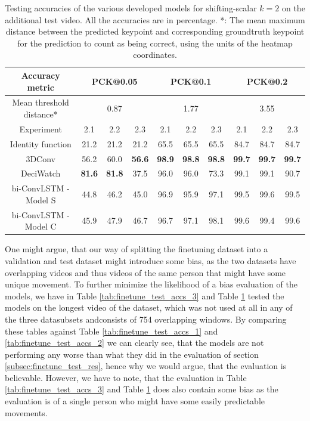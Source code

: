 \documentclass[./main.tex]{subfiles}
\begin{document}
\begin{table}[htbp]
    \begin{tabular}{c||ccc|ccc|ccc}
        \hline
        Accuracy metric & \multicolumn{3}{c}{PCK@0.05} & \multicolumn{3}{c}{PCK@0.1} & \multicolumn{3}{c}{PCK@0.2} \\
        \hline
        Mean threshold distance* & \multicolumn{3}{c}{0.87} & \multicolumn{3}{c}{1.77} & \multicolumn{3}{c}{3.55} \\
        \hline
        Experiment & 2.1 & 2.2 & 2.3 & 2.1 & 2.2 & 2.3 & 2.1 & 2.2 & 2.3 \\
        \hline
        \hline
        Identity function & 21.2 & 21.2 & 21.2 & 65.5 & 65.5 & 65.5 & 84.7 & 84.7 & 84.7 \\
        3DConv & 56.2 & 60.0 & \textbf{56.6} & \textbf{98.9} & \textbf{98.8} & \textbf{98.8} & \textbf{99.7} & \textbf{99.7} & \textbf{99.7} \\
        DeciWatch & \textbf{81.6} & \textbf{81.8} & 37.5 & 96.0 & 96.0 & 73.3 & 99.1 & 99.1 & 90.7 \\
        bi-ConvLSTM - Model S & 44.8 & 46.2 & 45.0 & 96.9 & 95.9 & 97.1 & 99.5 & 99.6 & 99.5 \\
        bi-ConvLSTM - Model C & 45.9 & 47.9 & 46.7 & 96.7 & 97.1 & 98.1 & 99.6 & 99.4 & 99.6 \\
        \hline
    \end{tabular}
    \caption{Testing accuracies of the various developed models for shifting-scalar $k = 2$ on the additional test video. All the accuracies are in percentage. *: The mean maximum distance between the predicted keypoint and corresponding groundtruth keypoint for the prediction to count as being correct, using the units of the heatmap coordinates.}
    \label{tab:finetune_test_accs_4}
\end{table}

\noindent One might argue, that our way of splitting the finetuning dataset into a validation and test dataset might introduce some bias, as the two datasets have overlapping videos and thus videos of the same person that might have some unique movement. To further minimize the likelihood of a bias evaluation of the models, we have in Table \ref{tab:finetune_test_accs_3} and Table \ref{tab:finetune_test_accs_4} tested the models on the longest video of the dataset, which was not used at all in any of the three datasubsets andconsists of 754 overlapping windows. By comparing these tables against Table \ref{tab:finetune_test_accs_1} and \ref{tab:finetune_test_accs_2} we can clearly see, that the models are not performing any worse than what they did in the evaluation of section \ref{subsec:finetune_test_res}, hence why we would argue, that the evaluation is believable. However, we have to note, that the evaluation in Table \ref{tab:finetune_test_accs_3} and Table \ref{tab:finetune_test_accs_4} does also contain some bias as the evaluation is of a single person who might have some easily predictable movements.
\end{document}

